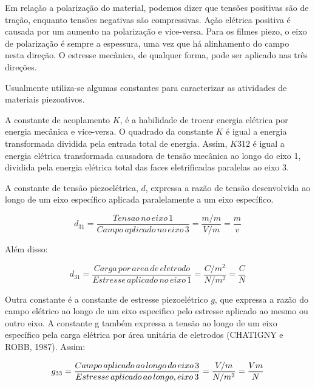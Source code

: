 \documentclass[
	12pt,				
	oneside,			
	a4paper,			
	english,			
	brazil,			
	]{abntex2ppgsi}
\begin{document}
Em relação a polarização do material, podemos dizer que tensões positivas são de tração, enquanto tensões negativas são compressivas. Ação elétrica positiva é causada por um aumento na polarização e vice-versa. Para os filmes piezo, o eixo de polarização é sempre a espessura, uma vez que há alinhamento do campo nesta direção. O estresse mecânico, de qualquer forma, pode ser aplicado nas três direções. 

Usualmente utiliza-se algumas constantes para caracterizar as atividades de materiais piezoativos. 

A constante de acoplamento $K$, é a habilidade de trocar energia elétrica por energia mecânica e vice-versa. O quadrado da constante $K$ é igual a energia transformada dividida pela entrada total de energia. Assim, $K312$ é igual a energia elétrica transformada causadora de tensão mecânica ao longo do eixo 1, dividida pela energia elétrica total das faces eletrificadas paralelas ao eixo 3. 

A constante de tensão piezoelétrica, $d$, expressa a razão de tensão desenvolvida ao longo de um eixo específico aplicada paralelamente a um eixo específico. 

\begin{equation}
	d_{31} = \frac{Tensao \,no \,eixo \,1}{Campo \,aplicado \,no \,eixo \,3} = \frac{m/m}{V/m} = \frac{m}{v}
	\label{eq: Constante de Tensão Piezoelétrica}
\end{equation}



Além disso:

\begin{equation}
	d_{31} = \frac{Carga \,por \,area \,de \,eletrodo}{Estresse \,aplicado \,no \,eixo \,1} = \frac{C/m^{2}}{N/m^{2}} = \frac{C}{N}
	\label{eq: Boa pergunta}
\end{equation}

Outra constante é a constante de estresse piezoelétrico $g$, que expressa a razão do campo elétrico ao longo de um eixo especifico pelo estresse aplicado ao mesmo ou outro eixo. A constante g também expressa a tensão ao longo de um eixo específico pela carga elétrica por área unitária de eletrodos (CHATIGNY e ROBB, 1987). Assim:

\begin{equation}
	g_{33} = \frac{Campo \,aplicado \,ao \,longo \,do \,eixo \,3}{Estresse \,aplicado \,ao \,longo ,\do \,eixo \,3} = \frac{V/m}{N/m^{2}} = \frac{Vm}{N}
	\label{eq: Constante G, expressando a razão do campo elétrico ao longo do eixo.}
\end{equation}
\end{document}
